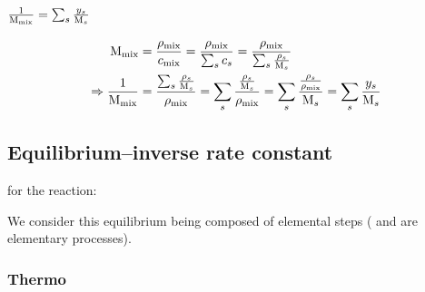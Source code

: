 \subsection{\texorpdfstring{$\frac{1}{\Mm[\text{mix}]} = \sum_s \frac{\massfrac[s]}{\Mm[s]}$}{Mixture molar mass}}
\label{demo-Mm}
\[
\begin{split}
\Mm[\text{mix}] & = \frac{\mass[\text{mix}]}{\conc_\text{mix}}
                  = \frac{\mass[\text{mix}]}{\sum_s \conc_s}
                  = \frac{\mass[\text{mix}]}{\sum_s \frac{\mass[s]}{\Mm[s]}}\\
\Rightarrow
\frac{1}{\Mm[\text{mix}]}
               & = \frac{\sum_s\frac{\mass[s]}{\Mm[s]}}{\mass[\text{mix}]}
                 = \sum_s\frac{\frac{\mass[s]}{\Mm[s]}}{\mass[\text{mix}]}
                 = \sum_s\frac{\frac{\mass[s]}{\mass[\text{mix}]}}{\Mm[s]}
                 = \sum_s\frac{\massfrac[s]}{\Mm[s]}
\end{split}
\]

\subsection{Equilibrium--inverse rate constant}

for the reaction:
\begin{chemicalEquation}
\label{eq:equat}
\end{chemicalEquation}

We consider this equilibrium being composed of elemental steps
( and
are elementary processes). 

\subsubsection{Thermo}
\label{demo-eq}

